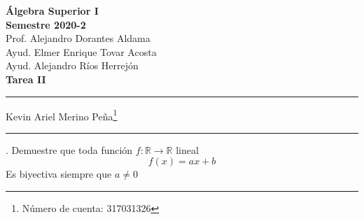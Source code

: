 \documentclass[letterpaper]{article}
\newcommand{\R}{\mathds{R}}
\renewcommand{\*}{\cdot}
\theoremstyle{definition}
\begin{document}
\begin{center}
	\vspace{-114pt}
	\textbf{\large Álgebra Superior I}\\
	\textbf{ Semestre 2020-2}\\
	Prof. Alejandro Dorantes Aldama\\
	Ayud. Elmer Enrique Tovar Acosta \\
	Ayud. Alejandro Ríos Herrejón \\
	\textbf{Tarea II}
\rule{19cm}{0.2mm}
	\begin{center}
Kevin Ariel Merino Peña\footnote[2]{Número de cuenta: 317031326}
	\end{center}
\rule{19cm}{0.2mm}
\end{center}
. Demuestre que toda función $ f: \R \to \R $ lineal 
\[ f(x) = ax +b \]
Es biyectiva siempre que $ a \neq 0 $\\
\end{document}
